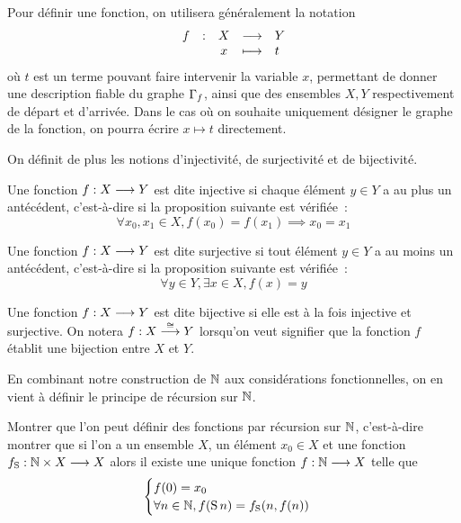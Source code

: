 \begin{notation}
  Pour définir une fonction, on utilisera généralement la notation
  \[\makeFun{f}{X}{Y}{x}{t}\]
  où $t$ est un terme pouvant faire intervenir la variable $x$, permettant de
  donner une description fiable du graphe $\Gamma_{f}$, ainsi que des
  ensembles $X,Y$ respectivement de départ et d'arrivée. Dans le cas où on
  souhaite uniquement désigner le graphe de la fonction, on pourra écrire
  $x \mapsto t$ directement.
\end{notation}

\noindent
On définit de plus les notions d'injectivité, de surjectivité et de bijectivité.

\begin{definition}
  Une fonction $f : \displaystyle X \longrightarrow Y$ est dite injective si chaque élément
  $y\in Y$ a au plus un antécédent, c'est-à-dire si la proposition suivante est
  vérifiée~:
  \[\forall x_0,x_1\in X, f(x_0) = f(x_1)\implies x_0 = x_1\]

  Une fonction $f : \displaystyle X \longrightarrow Y$ est dite surjective si tout élément
  $y\in Y$ a au moins un antécédent, c'est-à-dire si la proposition suivante est
  vérifiée~:
  \[\forall y\in Y, \exists x \in X, f(x) = y\]

  Une fonction $f : \displaystyle X \longrightarrow Y$ est dite bijective si elle est à la fois
  injective et surjective. On notera $f : \displaystyle X \overset{\cong}{\longrightarrow} Y$ lorsqu'on veut
  signifier que la fonction $f$ établit une bijection entre $X$ et $Y$.
\end{definition}

En combinant notre construction de $\mathbb N$ aux considérations fonctionnelles, on
en vient à définir le principe de récursion sur $\mathbb N$.

\begin{exercise}
  Montrer que l'on peut définir des fonctions par récursion sur $\mathbb N$,
  c'est-à-dire montrer que si l'on a un ensemble $X$, un élément $x_0\in X$ et
  une fonction $f_{\operatorname{S}} : \displaystyle \mathbb N \times X \longrightarrow X$ alors il existe une
  unique fonction $f : \displaystyle \mathbb N \longrightarrow X$ telle que
  \[\begin{cases}
  f(0) = x_0\\
  \forall n \in \mathbb N, f(\operatorname{S} n) = f_{\operatorname{S}}(n,f(n))
  \end{cases}\]
\end{exercise}

